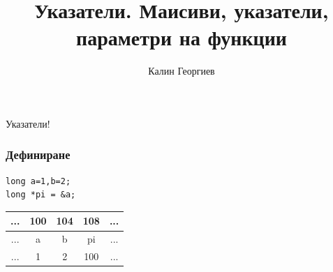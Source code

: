 \documentclass{beamer}
\begin{document}
\title[Увод в програмирането]{Указатели. Маисиви, указатели, параметри на функции} 
\author{Калин Георгиев} 
\frame{\titlepage} 



\begin{frame}
\centerline{Указатели!}
\end{frame}



\begin{frame}[fragile]
\frametitle{Дефиниране}
\begin{flushleft}
\begin{lstlisting}
long a=1,b=2;
long *pi = &a;
\end{lstlisting}
\end{flushleft}

\begin{center}
  

\begin{tabular}{c | c | c | c | c}
... & 100 & 104 & 108 & ...\\\hline
... & a   & b   & pi  & ... \\\hline
... & 1   & 2   & 100 & ... \\
  
\end{tabular}
\end{center}
\end{frame}
\end{document}
